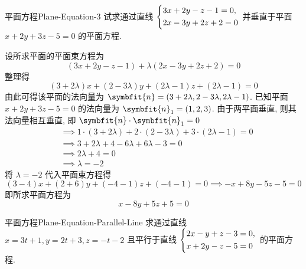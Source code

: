 \begin{problem}{平面方程}{Plane-Equation-3}
    试求通过直线 $\begin{dcases} 3x + 2y - z - 1 = 0, \\ 2x - 3y + 2z + 2 = 0 \end{dcases}$ 并垂直于平面 $x + 2y + 3z - 5 = 0$ 的平面方程.
\end{problem}

\begin{solution}
    设所求平面的平面束方程为
    \begin{equation}
        (3x + 2y - z - 1) + \lambda(2x - 3y + 2z + 2) = 0
    \end{equation}
    整理得
    \begin{equation}
        (3 + 2\lambda)x + (2 - 3\lambda)y + (2\lambda - 1)z + (2\lambda - 1) = 0
    \end{equation}
    由此可得该平面的法向量为 $\symbfit{n} = (3 + 2\lambda, 2 - 3\lambda, 2\lambda - 1)$.
    已知平面 $x + 2y + 3z - 5 = 0$ 的法向量为 $\symbfit{n}_1 = (1, 2, 3)$.
    由于两平面垂直, 则其法向量相互垂直, 即 $\symbfit{n} \cdot \symbfit{n}_1 = 0$
    \begin{equation}
        \begin{aligned}
             & \implies 1 \cdot (3 + 2\lambda) + 2 \cdot (2 - 3\lambda) + 3 \cdot (2\lambda - 1) = 0 \\
             & \implies 3 + 2\lambda + 4 - 6\lambda + 6\lambda - 3 = 0                               \\
             & \implies 2\lambda + 4 = 0                                                             \\
             & \implies \lambda = -2
        \end{aligned}
    \end{equation}
    将 $\lambda = -2$ 代入平面束方程得
    \begin{equation}
        (3 - 4)x + (2 + 6)y + (-4 - 1)z + (-4 - 1) = 0 \implies -x + 8y - 5z - 5 = 0
    \end{equation}
    即所求平面方程为
    \begin{equation}
        \boxed{x - 8y + 5z + 5 = 0}
    \end{equation}
\end{solution}


\begin{problem}{平面方程}{Plane-Equation-Parallel-Line}
    求通过直线 $x = 3t+1, y = 2t+3, z = -t-2$ 且平行于直线 $\begin{dcases} 2x - y + z - 3 = 0, \\ x + 2y - z - 5 = 0 \end{dcases}$ 的平面方程.
\end{problem}


